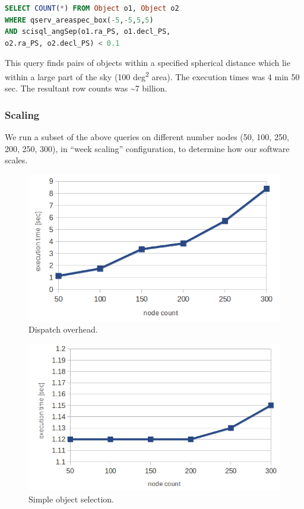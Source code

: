 \documentclass[DM,lsstdraft,toc]{lsstdoc}
\begin{document}
\begin{lstlisting}[language=SQL]
SELECT COUNT(*) FROM Object o1, Object o2
WHERE qserv_areaspec_box(-5,-5,5,5)
AND scisql_angSep(o1.ra_PS, o1.decl_PS,
o2.ra_PS, o2.decl_PS) < 0.1
\end{lstlisting}

This query finds pairs of objects within a specified spherical distance
which lie within a large part of the sky (100 deg\textsuperscript{2}
area). The execution times was 4 min 50 sec. The resultant row counts
was \textasciitilde{}7 billion.

\subsubsection{Scaling}\label{scaling-1}

We run a subset of the above queries on different number nodes (50, 100,
250, 200, 250, 300), in ``week scaling'' configuration, to determine how
our software scales.

\begin{figure}[H]
\centering
\includegraphics{_static/in2p3_dispatch_overhead.png}
\caption{Dispatch overhead.}
\end{figure}

\begin{figure}[H]
\centering
\includegraphics{_static/in2p3_simple_object_selection.png}
\caption{Simple object selection.}
\end{figure}
\end{document}
